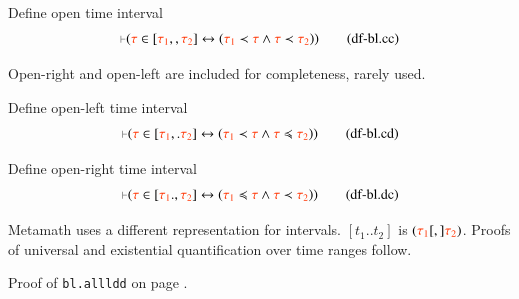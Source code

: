 \begin{definition} {Define open time interval}
\begin{align}
\mm{\vdash} ( \msc{\tau} \in [ \msc{\tau_1} ,, \msc{\tau_2} ] \leftrightarrow (
    \msc{\tau_1} \prec \msc{\tau} \wedge \msc{\tau} \prec \msc{\tau_2} )
    )\label{eq:df-bl.cc}\tag{df-bl.cc}
\end{align}
\end{definition}

\pn Open-right and open-left are included for completeness, rarely used.

\begin{definition} {Define open-left time interval}
\begin{align}
\mm{\vdash} ( \msc{\tau} \in [ \msc{\tau_1} ,. \msc{\tau_2} ] \leftrightarrow (
    \msc{\tau_1} \prec \msc{\tau} \wedge \msc{\tau} \preccurlyeq \msc{\tau_2} )
    )\label{eq:df-bl.cd}\tag{df-bl.cd}
\end{align}
\end{definition}

\begin{definition} {Define open-right time interval}
\begin{align}
\mm{\vdash} ( \msc{\tau} \in [ \msc{\tau_1} ., \msc{\tau_2} ] \leftrightarrow (
    \msc{\tau_1} \preccurlyeq \msc{\tau} \wedge \msc{\tau} \prec \msc{\tau_2} )
    )\label{eq:df-bl.dc}\tag{df-bl.dc}
\end{align}
\end{definition}

\pn Metamath uses a different representation for intervals.  $[t_{1}..t_{2}]$ is $( \msc{\tau_1} [,] \msc{\tau_2} )$.
Proofs of universal and existential quantification over time ranges follow.

\blalldd
Proof of {\tt bl.allldd} on page \pageref{proof:bl.alldd}.

